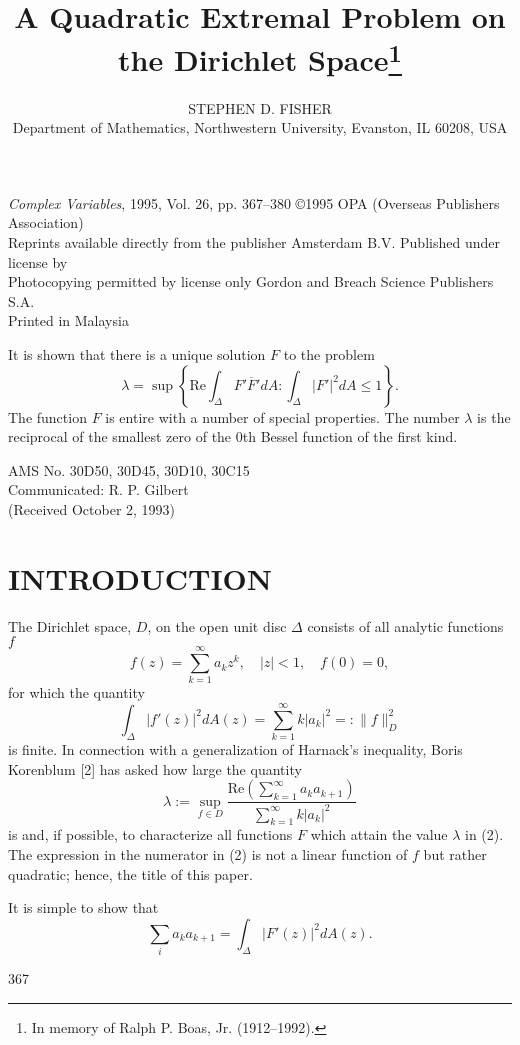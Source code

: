 \documentclass[12pt]{article}
\begin{document}
\title{A Quadratic Extremal Problem on the Dirichlet Space\thanks{In memory of Ralph P. Boas, Jr. (1912--1992).}}
\author{STEPHEN D. FISHER \\ \small Department of Mathematics, Northwestern University, Evanston, IL 60208, USA}
\date{}
\maketitle

\noindent
{\it Complex Variables}, 1995, Vol. 26, pp. 367--380 \hfill \copyright 1995 OPA (Overseas Publishers Association)\\
Reprints available directly from the publisher \hfill Amsterdam B.V. Published under license by\\
Photocopying permitted by license only \hfill Gordon and Breach Science Publishers S.A.\\
\hfill Printed in Malaysia

\vspace{1cm}

It is shown that there is a unique solution \( F \) to the problem
\[
\lambda = \sup \left\{ \text{Re} \int_\Delta F' \overline{F}' dA : \int_\Delta |F'|^2 dA \leq 1 \right\}.
\]
The function \( F \) is entire with a number of special properties. The number \( \lambda \) is the reciprocal of the smallest zero of the 0th Bessel function of the first kind.

\vspace{0.5cm}

AMS No. 30D50, 30D45, 30D10, 30C15\\
Communicated: R. P. Gilbert\\
(Received October 2, 1993)

\vspace{1cm}

\section*{INTRODUCTION}
The Dirichlet space, \( D \), on the open unit disc \( \Delta \) consists of all analytic functions \( f \)
\[
f(z) = \sum_{k=1}^\infty a_k z^k, \quad |z| < 1, \quad f(0) = 0,
\]
for which the quantity
\[
\int_\Delta |f'(z)|^2 dA(z) = \sum_{k=1}^\infty k |a_k|^2 =: \|f\|_D^2
\]
is finite. In connection with a generalization of Harnack's inequality, Boris Korenblum [2] has asked how large the quantity
\[
\lambda := \sup_{f \in D} \frac{\text{Re} \left( \sum_{k=1}^\infty a_k a_{k+1} \right)}{\sum_{k=1}^\infty k |a_k|^2}
\]
is and, if possible, to characterize all functions \( F \) which attain the value \( \lambda \) in (2). The expression in the numerator in (2) is not a linear function of \( f \) but rather quadratic; hence, the title of this paper.

It is simple to show that
\[
\sum_i a_k a_{k+1} = \int_\Delta |F'(z)|^2 dA(z).
\]

\vfill

367
\end{document}
